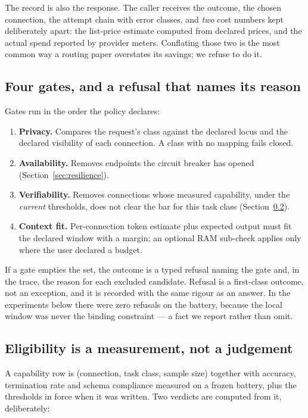 \documentclass[11pt]{article}
\begin{document}
The record is also the response. The caller receives the outcome, the chosen connection, the
attempt chain with error classes, and \emph{two} cost numbers kept deliberately apart: the
list-price estimate computed from declared prices, and the actual spend reported by provider
meters. Conflating those two is the most common way a routing paper overstates its savings;
we refuse to do it.

\subsection{Four gates, and a refusal that names its reason}

Gates run in the order the policy declares:

\begin{enumerate}
\item \textbf{Privacy.} Compares the request's class against the declared locus and the declared
visibility of each connection. A class with no mapping fails closed.
\item \textbf{Availability.} Removes endpoints the circuit breaker has opened
(Section~\ref{sec:resilience}).
\item \textbf{Verifiability.} Removes connections whose measured capability, under the
\emph{current} thresholds, does not clear the bar for this task class
(Section~\ref{sec:eligibility}).
\item \textbf{Context fit.} Per-connection token estimate plus expected output must fit the
declared window with a margin; an optional RAM sub-check applies only where the user declared a
budget.
\end{enumerate}

If a gate empties the set, the outcome is a typed refusal naming the gate and, in the trace, the
reason for each excluded candidate. Refusal is a first-class outcome, not an exception, and it
is recorded with the same rigour as an answer. In the experiments below there were zero refusals
on the battery, because the local window was never the binding constraint --- a fact we report
rather than omit.

\subsection{Eligibility is a measurement, not a judgement}
\label{sec:eligibility}

A capability row is (connection, task class, sample size) together with accuracy, termination
rate and schema compliance measured on a frozen battery, plus the thresholds in force when it
was written. Two verdicts are computed from it, deliberately:
\end{document}
